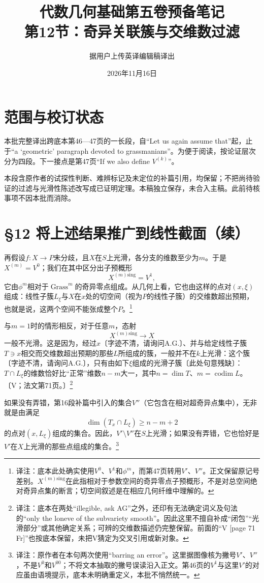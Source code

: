 \documentclass[openany,fontset=fandol]{ctexbook}
\newcommand{\note}[1]{\footnote{译注：#1}}
\begin{document}
\title{代数几何基础第五卷预备笔记\\第12节：奇异关联簇与交维数过滤}
\author{据用户上传英译编辑稿译出}
\date{2026年11月16日}
\maketitle
\chapter*{范围与校订状态}
本批完整译出跨底本第46—47页的一长段，自“Let us again assume that”起，止于“a `geometric' paragraph devoted to grassmanians”。为便于阅读，按论证层次分为四段。下一接点是第47页“If we also define $V^{(k)}$”。

本段含原作者的试探性判断、难辨标记及未定位的补篇引用，均保留；不把尚待验证的过滤与光滑性陈述改写成已证明定理。本稿独立保存，未合入主稿。此前待核事项不因本批而消除。
\chapter*{§12 将上述结果推广到线性截面（续）}
再假设$f\colon X\to P$未分歧，且$X$在$S$上光滑，各分支的维数至少为$m$。于是$X^{(m)}=V^0$；我们在其中区分出子预概形
\[
X^{(m)\mathrm{sing}}=V^1,
\]
它由$\phi^m$相对于$\operatorname{Grass}^m$的奇异零点组成。从几何上看，它也由这样的点对$(x,\xi)$组成：线性子簇$L_\xi$与$X$在$x$处的切空间（视为$P$的线性子簇）的交维数超出预期，也就是说，这两个空间不能张成整个$P$。\note{底本此处确实使用$V^0$、$V^1$和$\phi^m$，而第47页转用$V'$、$V''$。正文保留原记号差别。$X^{(m)\mathrm{sing}}$在此指相对于参数空间的奇异零点子预概形，不是对总空间绝对奇异点集的断言；切空间叙述是在相应几何纤维中理解的。}

与$m=1$时的情形相反，对于任意$m$，态射
\[
X^{(m)\mathrm{sing}}\longrightarrow X
\]
一般不光滑。这是因为，经过$x$〔字迹不清，请询问A.G.〕、并与给定线性子簇$T\ni x$相交而交维数超出预期的那些$L$所组成的簇，一般并不在$k$上光滑：这个簇〔字迹不清，请询问A.G.〕，只有由如下$\xi$组成的光滑子簇〔此处句意残缺〕：$T\cap L_\xi$的维数恰好比“正常”维数$n-m$大一，其中$n=\dim T$、$m=\operatorname{codim}L$。〔V；法文第71页。〕\note{底本在两处“illegible, ask AG”之外，还印有无法确定词义及句法的“only the loneve of the subvariety smooth”。因此这里不擅自补成“闭包”“光滑部分”或其他确定关系；可辨的交维数描述仍完整保留。前面的“V [page 71 Fr]”也按底本保留，未把V猜定为交叉引用或新对象。}

\newpage
如果没有弄错，第16段补篇中引入的集合$V''$（它包含在相对超奇异点集中），无非就是由满足
\[
\dim(T_x\cap L_\xi)\geq n-m+2
\]
的点对$(x,L_\xi)$组成的集合。因此，$V'\setminus V''$在$S$上光滑；如果没有弄错，它也恰好是$V'$在$X$上光滑的那些点组成的集合。\note{原作者在本句两次使用“barring an error”。这里据图像核为撇号$V'$、$V''$，不是$V^0$和$V^{00}$；不将文本抽取的撇号误读沿入正文。第46页的$V^1$与这里$V'$的对应虽由语境提示，底本未明确重定义，本批不悄然统一。}
\end{document}
